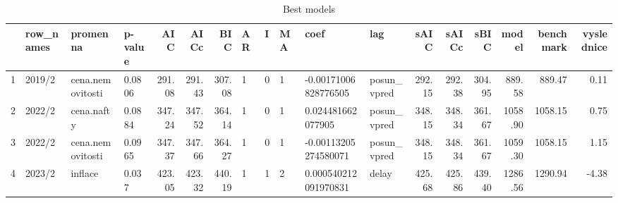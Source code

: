\begin{table}[ht]
\centering
\begin{tabular}{rlllrrrlllllrrrrrr}
  \hline
 & row\_names & promenna & p-value & AIC & AICc & BIC & AR & I & MA & coef & lag & sAIC & sAICc & sBIC & model & benchmark & vyslednice \\ 
  \hline
1 & 2019/2 & cena.nemovitosti & 0.0806 & 291.08 & 291.43 & 307.08 & 1 & 0 & 1 & -0.00171006828776505 & posun\_vpred & 292.15 & 292.38 & 304.95 & 889.58 & 889.47 & 0.11 \\ 
  2 & 2022/2 & cena.nafty & 0.0884 & 347.24 & 347.52 & 364.14 & 1 & 0 & 1 & 0.024481662077905 & posun\_vpred & 348.15 & 348.34 & 361.67 & 1058.90 & 1058.15 & 0.75 \\ 
  3 & 2022/2 & cena.nemovitosti & 0.0965 & 347.37 & 347.66 & 364.27 & 1 & 0 & 1 & -0.00113205274580071 & posun\_vpred & 348.15 & 348.34 & 361.67 & 1059.30 & 1058.15 & 1.15 \\ 
  4 & 2023/2 & inflace & 0.037 & 423.05 & 423.32 & 440.19 & 1 & 1 & 2 & 0.000540212091970831 & delay & 425.68 & 425.86 & 439.40 & 1286.56 & 1290.94 & -4.38 \\ 
   \hline
\end{tabular}
\caption{Best models} 
\end{table}
